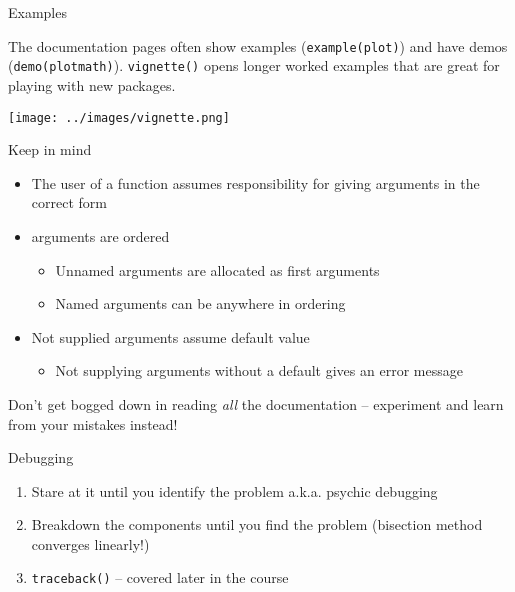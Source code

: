 \documentclass[ignorenonframetext,]{beamer}
\providecommand{\tightlist}{%
  \setlength{\itemsep}{0pt}\setlength{\parskip}{0pt}}
\begin{document}
\begin{frame}[fragile]{Examples}
\protect\hypertarget{examples}{}

The documentation pages often show examples (\texttt{example(plot)}) and
have demos (\texttt{demo(plotmath)}). \texttt{vignette()} opens longer
worked examples that are great for playing with new packages.

\texttt{[image: ../images/vignette.png]}

\end{frame}

\begin{frame}{Keep in mind}
\protect\hypertarget{keep-in-mind}{}

\begin{itemize}
\tightlist
\item
  The user of a function assumes responsibility for giving arguments in
  the correct form
\item
  arguments are ordered

  \begin{itemize}
  \tightlist
  \item
    Unnamed arguments are allocated as first arguments
  \item
    Named arguments can be anywhere in ordering
  \end{itemize}
\item
  Not supplied arguments assume default value

  \begin{itemize}
  \tightlist
  \item
    Not supplying arguments without a default gives an error message
  \end{itemize}
\end{itemize}

Don't get bogged down in reading \emph{all} the documentation --
experiment and learn from your mistakes instead!

\end{frame}

\begin{frame}[fragile]{Debugging}
\protect\hypertarget{debugging}{}

\begin{enumerate}
\tightlist
\item
  Stare at it until you identify the problem a.k.a. psychic debugging
\item
  Breakdown the components until you find the problem (bisection method
  converges linearly!)
\item
  \texttt{traceback()} -- covered later in the course
\end{enumerate}

\end{frame}
\end{document}

